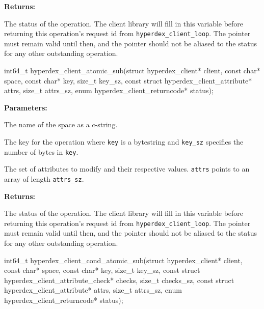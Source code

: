 \noindent\textbf{Returns:}
\begin{description}[labelindent=\widthof{{\texttt{status}}},leftmargin=*,noitemsep,nolistsep,align=right]
\item[\texttt{status}] The status of the operation.  The client library will fill in this variable before returning this operation's request id from \texttt{hyperdex\_client\_loop}.  The pointer must remain valid until then, and the pointer should not be aliased to the status for any other outstanding operation.
\end{description}

\funcsep
\begin{ccode}
int64_t hyperdex_client_atomic_sub(struct hyperdex_client* client,
                const char* space,
                const char* key, size_t key_sz,
                const struct hyperdex_client_attribute* attrs, size_t attrs_sz,
                enum hyperdex_client_returncode* status);
\end{ccode}
\funcdesc 

\noindent\textbf{Parameters:}
\begin{description}[labelindent=\widthof{{\texttt{attrs}, \texttt{attrs\_sz}}},leftmargin=*,noitemsep,nolistsep,align=right]
\item[\texttt{space}] The name of the space as a c-string.
\item[\texttt{key}, \texttt{key\_sz}] The key for the operation where \texttt{key} is a bytestring and \texttt{key\_sz} specifies the number of bytes in \texttt{key}.
\item[\texttt{attrs}, \texttt{attrs\_sz}] The set of attributes to modify and their respective values.  \texttt{attrs} points to an array of length \texttt{attrs\_sz}.
\end{description}

\noindent\textbf{Returns:}
\begin{description}[labelindent=\widthof{{\texttt{status}}},leftmargin=*,noitemsep,nolistsep,align=right]
\item[\texttt{status}] The status of the operation.  The client library will fill in this variable before returning this operation's request id from \texttt{hyperdex\_client\_loop}.  The pointer must remain valid until then, and the pointer should not be aliased to the status for any other outstanding operation.
\end{description}

\funcsep
\begin{ccode}
int64_t hyperdex_client_cond_atomic_sub(struct hyperdex_client* client,
                const char* space,
                const char* key, size_t key_sz,
                const struct hyperdex_client_attribute_check* checks, size_t checks_sz,
                const struct hyperdex_client_attribute* attrs, size_t attrs_sz,
                enum hyperdex_client_returncode* status);
\end{ccode}
\funcdesc 

